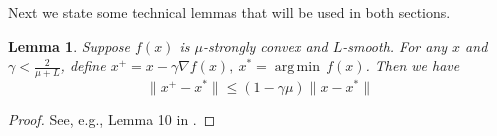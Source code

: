 \documentclass[10pt]{article}
\newtheorem{lemma}{Lemma}[section]
\theoremstyle{remark}
\newcommand{\realset}{\mathbb{R}}
\DeclareMathOperator*{\argmin}{arg\,min\,}
\begin{document}
Next we state some technical lemmas that will be used in both sections.
\begin{lemma}\label{lem: gd_decrease}
    Suppose $f(x)$ is $\mu$-strongly convex and $L$-smooth. For any $x$ and $\gamma<\frac{2}{\mu + L}$, define $x^+ = x - \gamma\nabla f(x),\ x^*=\argmin f(x)$. Then we have
    \[
        \|x^+ - x^*\| \leq (1-\gamma\mu)\|x-x^*\|
    \]
\end{lemma}
\begin{proof}
    See, e.g., Lemma 10 in \cite{qu2017harnessing}.
\end{proof}

\end{document}
